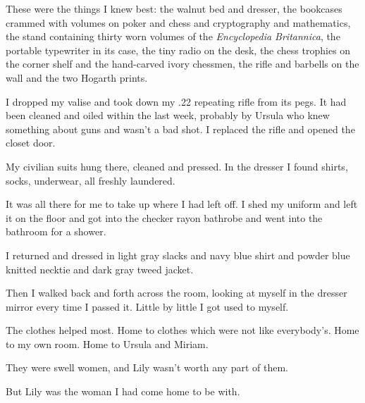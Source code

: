 \documentclass{novel}
\begin{document}
These were the things I knew best: the walnut bed and dresser, the bookcases crammed with volumes on poker and chess and cryptography and mathematics, the stand containing thirty worn volumes of the \textit{Encyclopedia Britannica}, the portable typewriter in its case, the tiny radio on the desk, the chess trophies on the corner shelf and the hand-carved ivory chessmen, the rifle and barbells on the wall and the two Hogarth prints.

I dropped my valise and took down my .22 repeating rifle from its pegs. It had been cleaned and oiled within the last week, probably by Ursula who knew something about guns and wasn’t a bad shot. I replaced the rifle and opened the closet door. 

My civilian suits hung there, cleaned and pressed. In the dresser I found shirts, socks, underwear, all freshly laundered.

It was all there for me to take up where I had left off. I shed my uniform and left it on the floor and got into the checker rayon bathrobe and went into the bathroom for a shower. 

I returned and dressed in light gray slacks and navy blue shirt and powder blue knitted necktie and dark gray tweed jacket. 

Then I walked back and forth across the room, looking at myself in the dresser mirror every time I passed it. Little by little I got used to myself.

The clothes helped most. Home to clothes which were not like everybody’s. Home to my own room. Home to Ursula and Miriam. 

They were swell women, and Lily wasn’t worth any part of them.

But Lily was the woman I had come home to be with.

\vspace{2\nbs}
\clearpage
\thispagestyle{empty}
\begin{ChapterStart}
\vspace{3\nbs}
\end{ChapterStart}
\end{document}

